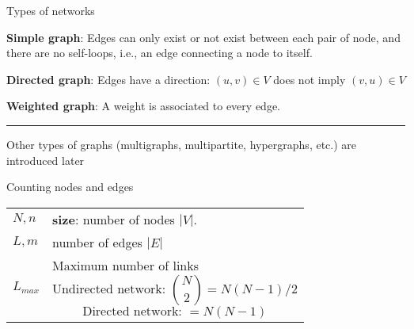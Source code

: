 \begin{textbox}{Types of networks}

    \textbf{Simple graph}: Edges can only exist or not exist between each pair of node, and there are no self-loops, i.e., an edge connecting a node to itself.

    \textbf{Directed graph}: Edges have a direction: $(u,v)\in V$ does not imply $(v,u)\in V$

    \textbf{Weighted graph}: A weight is associated to every edge.


    \noindent\rule{4cm}{0.1pt}

    \tiny{
        Other types of graphs (multigraphs, multipartite, hypergraphs, etc.) are introduced later}


\end{textbox}

\begin{textbox}{Counting nodes and edges}

    \begin{tabular}{p{}|p{}}\scriptsize
        $N,n$     & \textbf{size}: number of nodes $|V|$. \\

        $L,m$     & number of edges $|E|$                 \\
        $L_{max}$ & Maximum number of links
        \[  \text{Undirected network: } {N\choose 2 }=N(N-1)/2
        \]
        \[
            \text{Directed network: }=N(N-1)
        \]
    \end{tabular}

\end{textbox}

